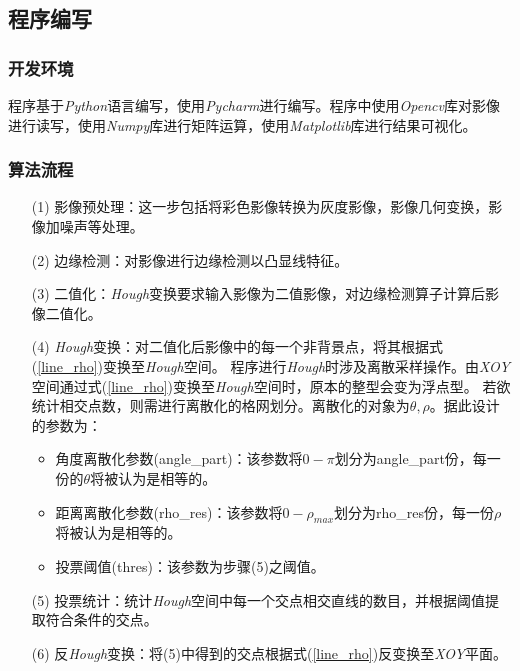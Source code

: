     
\subsection{程序编写}
    \subsubsection{开发环境}
        程序基于\textit{Python}语言编写，使用\textit{Pycharm}进行编写。程序中使用\textit{Opencv}库对影像进行读写，使用\textit{Numpy}库进行矩阵运算，使用\textit{Matplotlib}库进行结果可视化。
    \subsubsection{算法流程}
        \begin{enumerate}
            \item [(1)]影像预处理：这一步包括将彩色影像转换为灰度影像，影像几何变换，影像加噪声等处理。
            \item [(2)]边缘检测：对影像进行边缘检测以凸显线特征。
            \item [(3)]二值化：\textit{Hough}变换要求输入影像为二值影像，对边缘检测算子计算后影像二值化。
            \item [(4)]\textit{Hough}变换：对二值化后影像中的每一个非背景点，将其根据式(\ref{line_rho})变换至\textit{Hough}空间。
                        程序进行\textit{Hough}时涉及离散采样操作。由\textit{XOY}空间通过式(\ref{line_rho})变换至\textit{Hough}空间时，原本的整型会变为浮点型。
                        若欲统计相交点数，则需进行离散化的格网划分。离散化的对象为$\theta, \rho$。据此设计的参数为：
                        \begin{itemize}
                            \item 角度离散化参数(angle\_part)：该参数将$0-\pi$划分为angle\_part份，每一份的$\theta$将被认为是相等的。
                            \item 距离离散化参数(rho\_res)：该参数将$0-\rho_{max}$划分为rho\_res份，每一份$\rho$将被认为是相等的。
                            \item 投票阈值(thres)：该参数为步骤(5)之阈值。
                        \end{itemize}

            \item [(5)]投票统计：统计\textit{Hough}空间中每一个交点相交直线的数目，并根据阈值提取符合条件的交点。
            \item [(6)]反\textit{Hough}变换：将(5)中得到的交点根据式(\ref{line_rho})反变换至\textit{XOY}平面。
        \end{enumerate}

